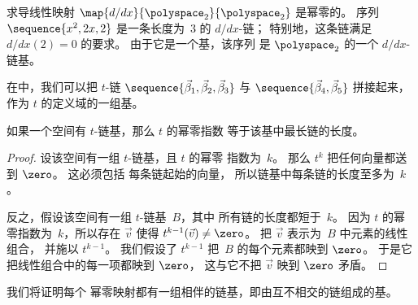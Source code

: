 \begin{example}
求导线性映射 \( \map{d/dx}{\polyspace_2}{\polyspace_2} \)
是幂零的。
序列
\( \sequence{x^2, 2x, 2} \)
是一条长度为~\( 3 \) 的 \( d/dx \)-链；
特别地，这条链满足 $d/dx(2)=0$ 的要求。
由于它是一个基，该序列
是 \( \polyspace_2\) 的一个 \( d/dx \)-链基。
\end{example}

\begin{example}
在中，我们可以把 $t$-链
$\sequence{\vec{\beta}_1,\vec{\beta}_2,\vec{\beta}_3}$ 与
$\sequence{\vec{\beta}_4,\vec{\beta}_5}$
拼接起来，作为 $t$ 的定义域的一组基。
\end{example}

\begin{lemma}  \label{le:LongestTowerIsIndex}
如果一个空间有 \( t \)-链基，那么 $t$ 的幂零指数
等于该基中最长链的长度。
\end{lemma}

\begin{proof}
设该空间有一组 $t$-链基，且 $t$ 的幂零
指数为~$k$。
那么 \( t^k \) 把任何向量都送到 \( \zero \)。
这必须包括
每条链起始的向量，
所以链基中每条链的长度至多为~$k$。

反之，假设该空间有一组 $t$-链基~$B$，其中
所有链的长度都短于~\( k \)。
因为 $t$ 的幂零指数为~$k$，所以存在 \( \vec{v} \)
使得 \( t^{k-1}(\vec{v})\neq\zero \)。
把 $\vec{v}$ 表示为~$B$ 中元素的线性组合，
并施以 \( t^{k-1} \)。
我们假设了 \( t^{k-1} \) 把~$B$ 的每个元素都映到 \( \zero \)。
于是它把线性组合中的每一项都映到 $\zero$，
这与它不把 \( \vec{v} \) 映到 \( \zero \) 矛盾。
\end{proof}

我们将证明每个
幂零映射都有一组相伴的链基，即由互不相交的链组成的基。

